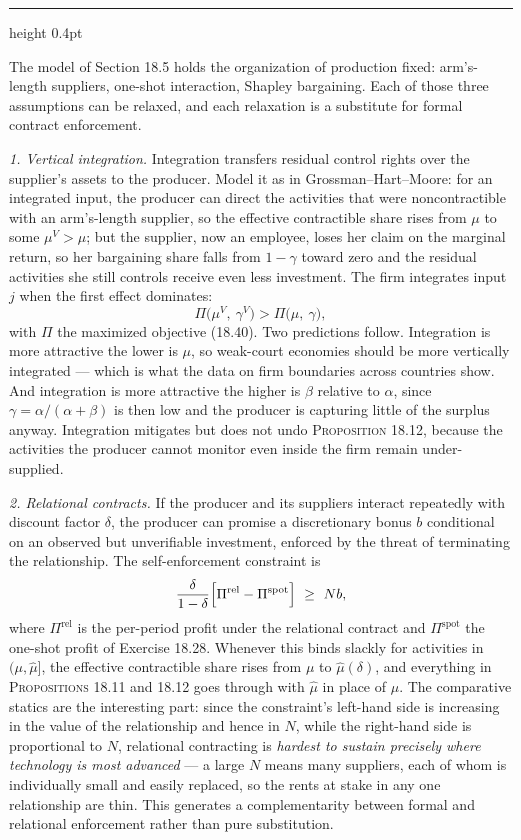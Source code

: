 \documentclass[11pt,letterpaper,reqno]{amsart}
\makeatletter
\newcommand{\as@head}[3]{%
  \par\addvspace{1.6ex}\penalty-200\relax
  \phantomsection
  \addcontentsline{toc}{subsection}{#1 #2\texorpdfstring{\ifx\relax#3\relax\else\quad #3\fi}{}}%
  {\color{RuleGrey}\hrule height 0.4pt}%
  \nobreak\vspace{0.8ex}\nobreak
  \noindent{\bfseries #1 #2}%
  \ifx\relax#3\relax\else\quad{\bfseries\itshape #3}\fi
  \par\nobreak\vspace{0.4ex}\nobreak
  \as@beginstatement
}
\newcommand{\as@beginstatement}{\begingroup\itshape\ignorespaces}
\newenvironment{aex}[2]{\as@head{Exercise}{#1}{#2}}{\par\addvspace{1.2ex}}
\newcommand{\bk}[1]{\textup{\textsc{#1}}}
\renewcommand{\as@beginstatement}{\ignorespaces}
\makeatother
\begin{document}
\begin{aex}{18.31}{}
The model of Section 18.5 holds the organization of production fixed: arm's-length suppliers,
one-shot interaction, Shapley bargaining.  Each of those three assumptions can be relaxed, and
each relaxation is a substitute for formal contract enforcement.

\emph{1. Vertical integration.}  Integration transfers residual control rights over the
supplier's assets to the producer.  Model it as in Grossman--Hart--Moore: for an integrated input,
the producer can direct the activities that were noncontractible with an arm's-length supplier, so
the effective contractible share rises from $\mu$ to some $\mu^V>\mu$; but the supplier, now an
employee, loses her claim on the marginal return, so her bargaining share falls from $1-\gamma$
toward zero and the residual activities she still controls receive even less investment.  The
firm integrates input $j$ when the first effect dominates:
\[
\Pi\bigl(\mu^V,\ \gamma^V\bigr)>\Pi\bigl(\mu,\ \gamma\bigr) ,
\]
with $\Pi$ the maximized objective \bk{(18.40)}.  Two predictions follow.  Integration is more
attractive the lower is $\mu$, so weak-court economies should be more vertically integrated ---
which is what the data on firm boundaries across countries show.  And integration is more
attractive the higher is $\beta$ relative to $\alpha$, since $\gamma=\alpha/(\alpha+\beta)$ is
then low and the producer is capturing little of the surplus anyway.  Integration mitigates but
does not undo \bk{Proposition 18.12}, because the activities the producer cannot monitor even
inside the firm remain under-supplied.

\emph{2. Relational contracts.}  If the producer and its suppliers interact repeatedly with
discount factor $\delta$, the producer can promise a discretionary bonus $b$ conditional on an
observed but unverifiable investment, enforced by the threat of terminating the relationship.  The
self-enforcement constraint is
\[
\frac{\delta}{1-\delta}\Bigl[\Pi^{\mathrm{rel}}-\Pi^{\mathrm{spot}}\Bigr]\ \ge\ N b ,
\]
where $\Pi^{\mathrm{rel}}$ is the per-period profit under the relational contract and
$\Pi^{\mathrm{spot}}$ the one-shot profit of Exercise 18.28.  Whenever this binds slackly for
activities in $(\mu,\hat\mu]$, the effective contractible share rises from $\mu$ to
$\hat\mu(\delta)$, and everything in \bk{Propositions 18.11} and \bk{18.12} goes through with
$\hat\mu$ in place of $\mu$.  The comparative statics are the interesting part: since the
constraint's left-hand side is increasing in the value of the relationship and hence in $N$, while
the right-hand side is proportional to $N$, relational contracting is \emph{hardest to sustain
precisely where technology is most advanced} --- a large $N$ means many suppliers, each of whom is
individually small and easily replaced, so the rents at stake in any one relationship are thin.
This generates a complementarity between formal and relational enforcement rather than pure
substitution.


\end{aex}
\end{document}
